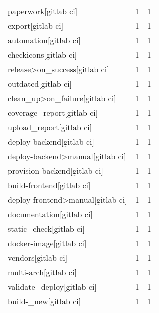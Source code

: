 \begin{tabular}{lrr}
paperwork[gitlab ci]                       &                   1 &             1 \\
export[gitlab ci]                          &                   1 &             1 \\
automation[gitlab ci]                      &                   1 &             1 \\
checkicons[gitlab ci]                      &                   1 &             1 \\
release>on\_success[gitlab ci]              &                   1 &             1 \\
outdated[gitlab ci]                        &                   1 &             1 \\
clean\_up>on\_failure[gitlab ci]             &                   1 &             1 \\
coverage\_report[gitlab ci]                 &                   1 &             1 \\
upload\_report[gitlab ci]                   &                   1 &             1 \\
deploy-backend[gitlab ci]                  &                   1 &             1 \\
deploy-backend>manual[gitlab ci]           &                   1 &             1 \\
provision-backend[gitlab ci]               &                   1 &             1 \\
build-frontend[gitlab ci]                  &                   1 &             1 \\
deploy-frontend>manual[gitlab ci]          &                   1 &             1 \\
documentation[gitlab ci]                   &                   1 &             1 \\
static\_check[gitlab ci]                    &                   1 &             1 \\
docker-image[gitlab ci]                    &                   1 &             1 \\
vendors[gitlab ci]                         &                   1 &             1 \\
multi-arch[gitlab ci]                      &                   1 &             1 \\
validate\_deploy[gitlab ci]                 &                   1 &             1 \\
build-\_new[gitlab ci]                      &                   1 &             1 \\

\end{tabular}
